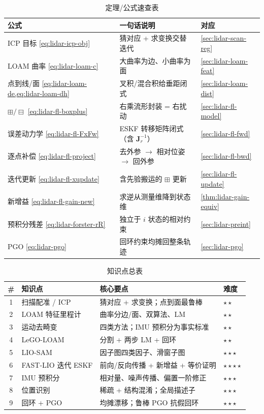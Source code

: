 \begin{table}[H]\centering\small
\caption{定理/公式速查表}
\begin{tabular}{lll}
\toprule
公式 & 一句话说明 & 对应 \\
\midrule
ICP 目标 \cref{eq:lidar-icp-obj} & 猜对应 + 求变换交替迭代 & \cref{sec:lidar-scan-reg} \\
LOAM 曲率 \cref{eq:lidar-loam-c} & 大曲率为边、小曲率为面 & \cref{sec:lidar-loam-feat} \\
点到线/面 \cref{eq:lidar-loam-de,eq:lidar-loam-dh} & 叉积/混合积给垂距闭式 & \cref{sec:lidar-loam-dist} \\
$\boxplus/\boxminus$ \cref{eq:lidar-fl-boxplus} & 右乘流形封装 = 右扰动 & \cref{sec:lidar-fl-model} \\
误差动力学 \cref{eq:lidar-fl-FxFw} & ESKF 转移矩阵闭式（含 $\mathbf{J}_r^{-1}$） & \cref{sec:lidar-fl-fwd} \\
逐点补偿 \cref{eq:lidar-fl-project} & 去外参 $\to$ 相对位姿 $\to$ 回外参 & \cref{sec:lidar-fl-bwd} \\
迭代更新 \cref{eq:lidar-fl-xupdate} & 含先验搬运的 $\boxplus$ 更新 & \cref{sec:lidar-fl-update} \\
新增益 \cref{eq:lidar-fl-gain-new} & 求逆从测量维降到状态维 & \cref{thm:lidar-gain-equiv} \\
预积分残差 \cref{eq:lidar-forster-rR} & 独立于 $i$ 状态的相对约束 & \cref{sec:lidar-preint} \\
PGO \cref{eq:lidar-pgo} & 回环约束均摊回整条轨迹 & \cref{sec:lidar-pgo} \\
\bottomrule
\end{tabular}
\end{table}

\begin{table}[H]\centering\small
\caption{知识点总表}
\begin{tabular}{clll}
\toprule
\# & 知识点 & 核心要点 & 难度 \\
\midrule
1 & 扫描配准 / ICP & 猜对应 + 求变换；点到面最鲁棒 & $\star\star$ \\
2 & LOAM 特征里程计 & 曲率分边/面、双算法、LM & $\star\star$ \\
3 & 运动去畸变 & 四类方法；IMU 预积分为事实标准 & $\star\star$ \\
4 & LeGO-LOAM & 分割 + 两步 LM + 回环 & $\star\star$ \\
5 & LIO-SAM & 因子图四类因子、滑窗子图 & $\star\star\star$ \\
6 & FAST-LIO 迭代 ESKF & 前向/反向传播 + 新增益 + 等价证明 & $\star\star\star\star$ \\
7 & IMU 预积分 & 相对量、噪声传播、偏置一阶修正 & $\star\star\star$ \\
8 & 位置识别 & 稀疏 + 结构混淆；全局描述子 & $\star\star\star$ \\
9 & 回环 + PGO & 均摊漂移；鲁棒 PGO 抗假回环 & $\star\star\star$ \\
\bottomrule
\end{tabular}
\end{table}

